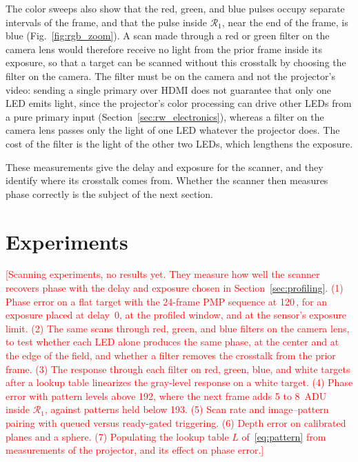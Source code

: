 \documentclass[10pt,journal,compsoc]{IEEEtran}
\newcommand{\SI}[2]{#1\,#2}
\newcommand{\pending}[1]{\textcolor{red}{[#1]}}
\begin{document}
The color sweeps also show that the red, green, and blue pulses occupy separate intervals of the
frame, and that the pulse inside $\mathcal R_1$, near the end of the frame, is blue
(Fig.~\ref{fig:rgb_zoom}). A scan made
through a red or green filter on the camera lens would therefore receive no light from the prior
frame inside its exposure, so that a target can be scanned without this crosstalk by choosing the
filter on the camera. The filter must be on the camera and not the projector's video: sending a
single primary over HDMI does not guarantee that only one LED emits light, since the projector's
color processing can drive other LEDs from a pure primary input (Section~\ref{sec:rw_electronics}),
whereas a filter on the camera lens passes only the light of one LED whatever the projector does.
The cost of the filter is the light of the other two LEDs, which lengthens the exposure.

These measurements give the delay and exposure for the scanner, and they identify where its
crosstalk comes from. Whether the scanner then measures phase correctly is the subject of the
next section.

\section{Experiments}
\label{sec:experiments}

\pending{Scanning experiments, no results yet. They measure how well the scanner recovers phase
with the delay and exposure chosen in Section~\ref{sec:profiling}.
(1) Phase error on a flat target with the 24-frame PMP sequence at \SI{120}{\hertz}, for an
exposure placed at delay~0, at the profiled window, and at the sensor's exposure limit.
(2) The same scans through red, green, and blue filters on the camera lens, to test whether each
LED alone produces the same phase, at the center and at the edge of the field, and whether a
filter removes the crosstalk from the prior frame.
(3) The response through each filter on red, green, blue, and white targets after a lookup
table linearizes the gray-level response on a white target.
(4) Phase error with pattern levels above 192, where the next frame adds 5 to 8~ADU inside
$\mathcal R_1$, against patterns held below 193.
(5) Scan rate and image--pattern pairing with queued versus ready-gated triggering.
(6) Depth error on calibrated planes and a sphere.
(7) Populating the lookup table $L$ of~\eqref{eq:pattern} from measurements of the projector, and
its effect on phase error.}
\end{document}
